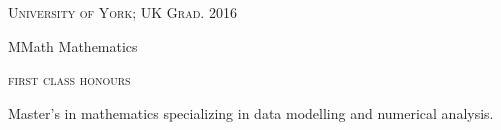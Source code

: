 \textsc{\small{University of York; UK
    \hfill
    {\raggedleft
        Grad. 2016
    }
}}

{\raggedright\large {
    MMath Mathematics
} \\}

\textsc{\small{\color{highlight}
    first class honours
}}

\normalsize{
    Master's in mathematics specializing in data modelling and numerical analysis.
} \\
